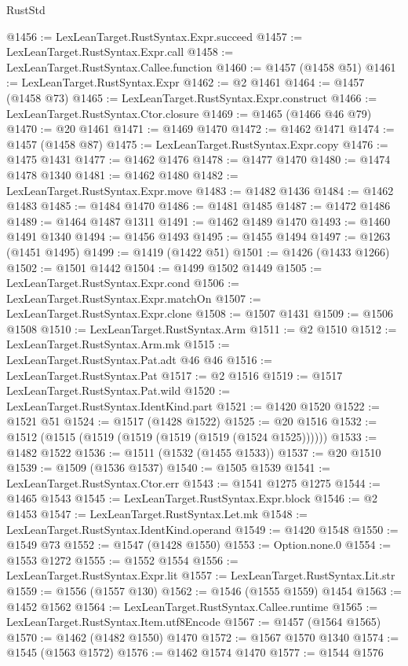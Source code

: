 \begin{lexlean}{RustStd}
\begin{coremodule}
@1456 := LexLeanTarget.RustSyntax.Expr.succeed
@1457 := LexLeanTarget.RustSyntax.Expr.call
@1458 := LexLeanTarget.RustSyntax.Callee.function
@1460 := @1457 (@1458 @51)
@1461 := LexLeanTarget.RustSyntax.Expr
@1462 := @2 @1461
@1464 := @1457 (@1458 @73)
@1465 := LexLeanTarget.RustSyntax.Expr.construct
@1466 := LexLeanTarget.RustSyntax.Ctor.closure
@1469 := @1465 (@1466 @46 @79)
@1470 := @20 @1461
@1471 := @1469 @1470
@1472 := @1462 @1471
@1474 := @1457 (@1458 @87)
@1475 := LexLeanTarget.RustSyntax.Expr.copy
@1476 := @1475 @1431
@1477 := @1462 @1476
@1478 := @1477 @1470
@1480 := @1474 @1478 @1340
@1481 := @1462 @1480
@1482 := LexLeanTarget.RustSyntax.Expr.move
@1483 := @1482 @1436
@1484 := @1462 @1483
@1485 := @1484 @1470
@1486 := @1481 @1485
@1487 := @1472 @1486
@1489 := @1464 @1487 @1311
@1491 := @1462 @1489 @1470
@1493 := @1460 @1491 @1340
@1494 := @1456 @1493
@1495 := @1455 @1494
@1497 := @1263 (@1451 @1495)
@1499 := @1419 (@1422 @51)
@1501 := @1426 (@1433 @1266)
@1502 := @1501 @1442
@1504 := @1499 @1502 @1449
@1505 := LexLeanTarget.RustSyntax.Expr.cond
@1506 := LexLeanTarget.RustSyntax.Expr.matchOn
@1507 := LexLeanTarget.RustSyntax.Expr.clone
@1508 := @1507 @1431
@1509 := @1506 @1508
@1510 := LexLeanTarget.RustSyntax.Arm
@1511 := @2 @1510
@1512 := LexLeanTarget.RustSyntax.Arm.mk
@1515 := LexLeanTarget.RustSyntax.Pat.adt @46 @46
@1516 := LexLeanTarget.RustSyntax.Pat
@1517 := @2 @1516
@1519 := @1517 LexLeanTarget.RustSyntax.Pat.wild
@1520 := LexLeanTarget.RustSyntax.IdentKind.part
@1521 := @1420 @1520
@1522 := @1521 @51
@1524 := @1517 (@1428 @1522)
@1525 := @20 @1516
@1532 := @1512 (@1515 (@1519 (@1519 (@1519 (@1519 (@1524 @1525))))))
@1533 := @1482 @1522
@1536 := @1511 (@1532 (@1455 @1533))
@1537 := @20 @1510
@1539 := @1509 (@1536 @1537)
@1540 := @1505 @1539
@1541 := LexLeanTarget.RustSyntax.Ctor.err
@1543 := @1541 @1275 @1275
@1544 := @1465 @1543
@1545 := LexLeanTarget.RustSyntax.Expr.block
@1546 := @2 @1453
@1547 := LexLeanTarget.RustSyntax.Let.mk
@1548 := LexLeanTarget.RustSyntax.IdentKind.operand
@1549 := @1420 @1548
@1550 := @1549 @73
@1552 := @1547 (@1428 @1550)
@1553 := Option.none.{0}
@1554 := @1553 @1272
@1555 := @1552 @1554
@1556 := LexLeanTarget.RustSyntax.Expr.lit
@1557 := LexLeanTarget.RustSyntax.Lit.str
@1559 := @1556 (@1557 @130)
@1562 := @1546 (@1555 @1559) @1454
@1563 := @1452 @1562
@1564 := LexLeanTarget.RustSyntax.Callee.runtime
@1565 := LexLeanTarget.RustSyntax.Item.utf8Encode
@1567 := @1457 (@1564 @1565)
@1570 := @1462 (@1482 @1550) @1470
@1572 := @1567 @1570 @1340
@1574 := @1545 (@1563 @1572)
@1576 := @1462 @1574 @1470
@1577 := @1544 @1576

\end{coremodule}
\end{lexlean}
